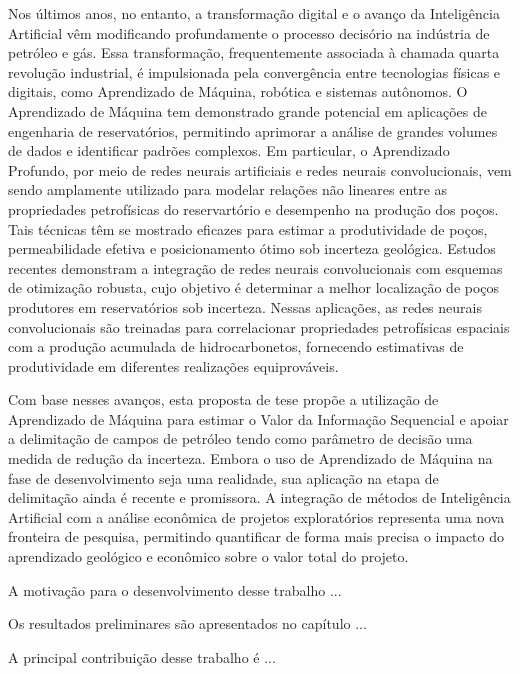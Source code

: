 Nos últimos anos, no entanto, a transformação digital e o avanço da Inteligência Artificial vêm modificando profundamente o processo decisório na indústria de petróleo e gás. Essa transformação, frequentemente associada à chamada quarta revolução industrial, é impulsionada pela convergência entre tecnologias físicas e digitais, como Aprendizado de Máquina, robótica e sistemas autônomos. O Aprendizado de Máquina tem demonstrado grande potencial em aplicações de engenharia de reservatórios, permitindo aprimorar a análise de grandes volumes de dados e identificar padrões complexos. Em particular, o Aprendizado Profundo, por meio de redes neurais artificiais e redes neurais convolucionais, vem sendo amplamente utilizado para modelar relações não lineares entre as propriedades petrofísicas do reservartório e desempenho na produção dos poços. Tais técnicas têm se mostrado eficazes para estimar a produtividade de poços, permeabilidade efetiva e posicionamento ótimo sob incerteza geológica. Estudos recentes demonstram a integração de redes neurais convolucionais com esquemas de otimização robusta, cujo objetivo é determinar a melhor localização de poços produtores em reservatórios sob incerteza. Nessas aplicações, as redes neurais convolucionais são treinadas para correlacionar propriedades petrofísicas espaciais com a produção acumulada de hidrocarbonetos, fornecendo estimativas de produtividade em diferentes realizações equiprováveis.

Com base nesses avanços, esta proposta de tese propõe a utilização de Aprendizado de Máquina para estimar o Valor da Informação Sequencial e apoiar a delimitação de campos de petróleo tendo como parâmetro de decisão uma medida de redução da incerteza. Embora o uso de Aprendizado de Máquina na fase de desenvolvimento seja uma realidade, sua aplicação na etapa de delimitação ainda é recente e promissora. A integração de métodos de Inteligência Artificial com a análise econômica de projetos exploratórios representa uma nova fronteira de pesquisa, permitindo quantificar de forma mais precisa o impacto do aprendizado geológico e econômico sobre o valor total do projeto.

A motivação para o desenvolvimento desse trabalho ...

Os resultados preliminares são apresentados no capítulo ...

A principal contribuição desse trabalho é ...

